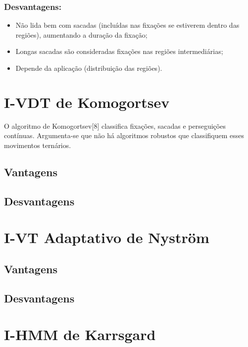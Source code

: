 \documentclass[brazil,]{report}
\begin{document}
\subsection{Desvantagens:}\label{desvantagens-4}

\begin{itemize}
\itemsep1pt\parskip0pt
\item
  Não lida bem com sacadas (incluídas nas fixações se estiverem dentro
  das regiões), aumentando a duração da fixação;
\item
  Longas sacadas são consideradas fixações nas regiões intermediárias;
\item
  Depende da aplicação (distribuição das regiões).
\end{itemize}

\chapter{I-VDT de Komogortsev}\label{i-vdt-de-komogortsev}

O algoritmo de Komogortsev{[}8{]} classifica fixações, sacadas e
perseguições contínuas. Argumenta-se que não há algoritmos robustos que
classifiquem esses movimentos ternários.

\section{Vantagens}\label{vantagens-5}

\section{Desvantagens}\label{desvantagens-5}

\chapter{I-VT Adaptativo de
Nyström}\label{i-vt-adaptativo-de-nystruxf6m}

\section{Vantagens}\label{vantagens-6}

\section{Desvantagens}\label{desvantagens-6}

\chapter{I-HMM de Karrsgard}\label{i-hmm-de-karrsgard}
\end{document}
